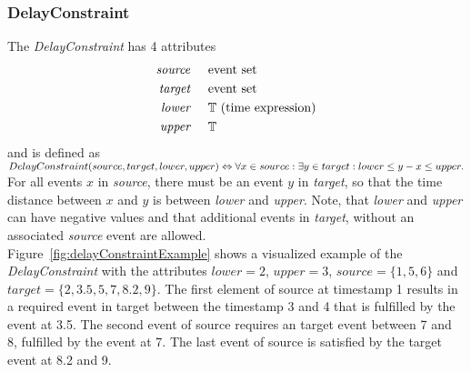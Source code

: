 	\subsubsection{DelayConstraint}
		The \emph{DelayConstraint} has 4 attributes
		\begin{align*}
			\emph{source} & \hspace{.5cm}\text{event set}\\
			\emph{target} & \hspace{.5cm}\text{event set}\\
			\emph{lower}  & \hspace{.5cm}\text{$\mathbb{T}$ (time expression)}\\
			\emph{upper}  & \hspace{.5cm}\text{$\mathbb{T}$}
		\end{align*}
		and is defined as\\[10pt]
		\begin{math}
			DelayConstraint ( source, target, lower, upper )\\
			\Leftrightarrow \forall x\in source:\exists y\in target: lower\leq y-x\leq upper.
		\end{math}\\[10pt]
		For all events $x$ in \emph{source}, there must be an event $y$ in \emph{target}, so that the time distance between $x$ and $y$ is between \emph{lower} and \emph{upper}. Note, that \emph{lower} and \emph{upper} can have negative values and that additional events in \emph{target}, without an associated \emph{source} event are allowed.\\
		Figure~\ref{fig:delayConstraintExample} shows a visualized example of the \emph{DelayConstraint} with the attributes $lower=2$, $upper=3$, $source=\{1, 5, 6\}$ and $target=\{2, 3.5, 5, 7, 8.2, 9\}$. The first element of source at timestamp 1 results in a required event in target between the timestamp 3 and 4 that is fulfilled by the event at 3.5. The second event of source requires an target event between 7 and 8, fulfilled by the event at 7. The last event of source is satisfied by the target event at 8.2 and 9.
